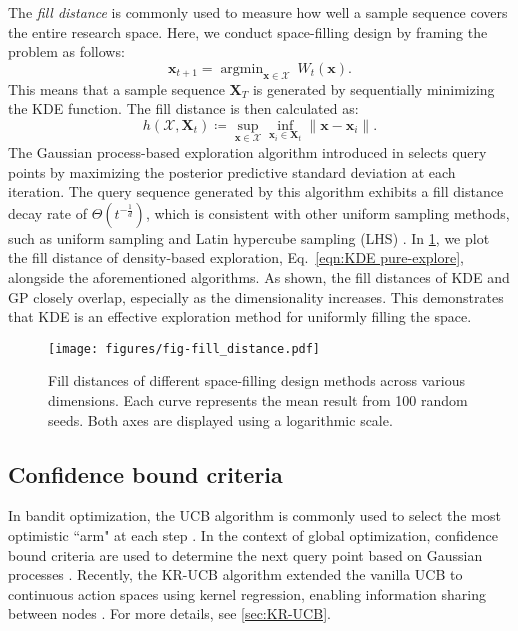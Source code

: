\documentclass[11pt,en]{elegantpaper}
\newcommand{\domain}{\mathcal{X}}
\newcommand{\X}{\bm{X}}
\newcommand{\x}{\bm{x}}
\newcommand{\1}{\mathds{1}}
\DeclareMathOperator*{\argmin}{argmin}
\begin{document}
The \textit{fill distance} is commonly used to measure how well a sample sequence covers the entire research space. Here, we conduct space-filling design by framing the problem as follows:
\begin{equation}
    \label{eqn:KDE pure-explore}
    \x_{t+1} = \argmin_{\x \in \domain}~W_t(\x).
\end{equation}
This means that a sample sequence $\X_T$ is generated by sequentially minimizing the KDE function. The fill distance is then calculated as:
\begin{equation}
    \label{eqn:fill distance}
    h(\domain, \X_t) \coloneqq \sup_{\x \in \domain} \inf_{\x_i \in \X_t} \| \x - \x_i \|.
\end{equation}
The Gaussian process-based exploration algorithm introduced in \cite{wenzel2021novel} selects query points by maximizing the posterior predictive standard deviation at each iteration. The query sequence generated by this algorithm exhibits a fill distance decay rate of $\Theta(t^{-\frac{1}{d}})$, which is consistent with other uniform sampling methods, such as uniform sampling and Latin hypercube sampling (LHS) \cite{mckay1979comparison}.
In \cref{fig:fill distance}, we plot the fill distance of density-based exploration, Eq.~\eqref{eqn:KDE pure-explore}, alongside the aforementioned algorithms. As shown, the fill distances of KDE and GP closely overlap, especially as the dimensionality increases. This demonstrates that KDE is an effective exploration method for uniformly filling the space.

\begin{figure}[H]
    \centering
    \texttt{[image: figures/fig-fill\_distance.pdf]}
    \caption{
        Fill distances of different space-filling design methods across various dimensions. Each curve represents the mean result from 100 random seeds.
        Both axes are displayed using a logarithmic scale.
    }
    \label{fig:fill distance}
\end{figure}




\subsection{Confidence bound criteria}
\label{sec:confidence bound criteria}

In bandit optimization, the UCB algorithm is commonly used to select the most optimistic ``arm" at each step \cite{auer2002finite}.
In the context of global optimization, confidence bound criteria are used to determine the next query point based on Gaussian processes \cite{cox1992statistical,cox1997sdo,srinivas2010gaussian}.
Recently, the KR-UCB algorithm extended the vanilla UCB to continuous action spaces using kernel regression, enabling information sharing between nodes \cite{yee2016monte}. For more details, see \cref{sec:KR-UCB}.
\end{document}
